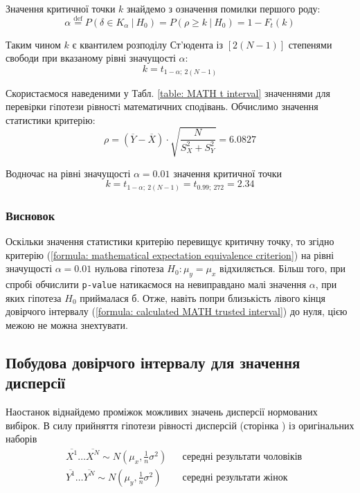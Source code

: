 Значення критичної точки $k$ знайдемо з означення помилки першого роду: 
\begin{equation*}
    \alpha\overset{\mathrm{def}}{=}P(\delta\in K_{\alpha}\ |\ H_0)=P(\rho \geqslant k\ |\ H_0)=1-F_t(k)
\end{equation*}

Таким чином $k$ є квантилем розподілу Ст'юдента із $\left[ 2(N-1) \right]$ степенями свободи при вказаному 
рівні значущості $\alpha$:
\begin{equation}
    k=t_{1-\alpha;\ 2(N-1)} \label{formula: mathematical expectation equivalence criterion values}
\end{equation}

Скористаємося наведеними у Табл. \ref{table: MATH t interval} значеннями для перевiрки гiпотези рiвностi 
математичних сподівань. Обчислимо значення статистики критерію:
\begin{equation*}
    \rho = (\overline{Y}-\overline{X}) \cdot \sqrt{\frac{N}{S_X^2+S_Y^2}} = 6.0827
\end{equation*}

Водночас на рівні значущості $\alpha=0.01$ значення критичної точки
\begin{equation*} 
   k = t_{1-\alpha;\ 2(N-1)} = t_{0.99;\ 272} = 2.34
\end{equation*}

\subsubsection{Висновок}

Оскільки значення статистики критерію перевищує критичну точку, то згідно критерію 
(\ref{formula: mathematical expectation equivalence criterion}) на рівні значущості $\alpha=0.01$ нульова 
гіпотеза $H_0: \mu_y=\mu_x$ відхиляється. Більш того, при спробі обчислити \texttt{p-value} натикаємося на 
невиправдано малі значення $\alpha$, при яких гіпотеза $H_0$ приймалася б. Отже, навіть попри близькість 
лівого кінця довірчого інтервалу (\ref{formula: calculated MATH trusted interval}) до нуля, цією межою не 
можна знехтувати.

\subsection{Побудова довірчого інтервалу для значення дисперсії}

Наостанок віднайдемо проміжок можливих значень дисперсії нормованих вибірок. В силу прийняття гіпотези 
рівності дисперсій (сторінка \pageref{page: MATH dispersion hypothesis}) із оригінальних наборів
\begin{align*}
    &\overline{X^1}\ldots \overline{X^N}\sim N(\mu_x,\tfrac{1}{n}\sigma^2) && \text{середні результати чоловіків} \\
    &\overline{Y^1}\ldots \overline{Y^N}\sim N(\mu_y,\tfrac{1}{n}\sigma^2) && \text{середні результати жінок}
\end{align*}

